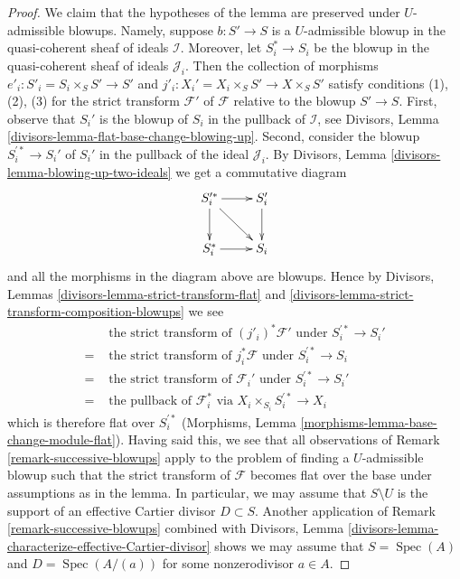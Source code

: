 \documentclass[10pt,a4paper]{amsart}
\theoremstyle{plain}
\theoremstyle{definition}
\theoremstyle{remark}
\numberwithin{equation}{subsection}
\def\Spec{\mathop{\mathrm{Spec}}}
\begin{document}
\begin{proof}
We claim that the hypotheses of the lemma are preserved under $U$-admissible
blowups. Namely, suppose $b : S' \to S$ is a $U$-admissible blowup in
the quasi-coherent sheaf of ideals $\mathcal{I}$. Moreover, let $S^*_i \to S_i$
be the blowup in the quasi-coherent sheaf of ideals $\mathcal{J}_i$.
Then the collection of morphisms $e'_i : S'_i = S_i \times_S S' \to S'$
and $j'_i : X_i' = X_i \times_S S' \to X \times_S S'$ satisfy conditions
(1), (2), (3) for the strict transform $\mathcal{F}'$ of $\mathcal{F}$
relative to the blowup $S' \to S$. First, observe that $S_i'$ is the
blowup of $S_i$ in the pullback of $\mathcal{I}$, see
Divisors, Lemma \ref{divisors-lemma-flat-base-change-blowing-up}.
Second, consider the blowup
$S_i^{\prime *} \to S_i'$ of $S_i'$ in the pullback of the ideal
$\mathcal{J}_i$.
By Divisors, Lemma \ref{divisors-lemma-blowing-up-two-ideals}
we get a commutative diagram
$$
\xymatrix{
S_i^{\prime *} \ar[r] \ar[rd] \ar[d] & S'_i \ar[d] \\
S_i^* \ar[r] & S_i
}
$$
and all the morphisms in the diagram above are blowups. Hence by
Divisors, Lemmas \ref{divisors-lemma-strict-transform-flat} and
\ref{divisors-lemma-strict-transform-composition-blowups}
we see
\begin{align*}
& \text{ the strict transform of }(j'_i)^*\mathcal{F}'\text{ under }
S_i^{\prime *} \to S_i' \\
= &
\text{ the strict transform of }j_i^*\mathcal{F}\text{ under }
S_i^{\prime *} \to S_i \\
= &
\text{ the strict transform of }\mathcal{F}_i'\text{ under }
S_i^{\prime *} \to S_i' \\
= &
\text{ the pullback of }\mathcal{F}_i^*\text{ via }
X_i \times_{S_i} S_i^{\prime *} \to X_i
\end{align*}
which is therefore flat over $S_i^{\prime *}$
(Morphisms, Lemma \ref{morphisms-lemma-base-change-module-flat}).
Having said this, we see that all observations of
Remark \ref{remark-successive-blowups} apply to the
problem of finding a $U$-admissible blowup such that the
strict transform of $\mathcal{F}$ becomes flat over the base
under assumptions as in the lemma. In particular, we may assume
that $S \setminus U$ is the support of an effective Cartier divisor
$D \subset S$. Another application of Remark \ref{remark-successive-blowups}
combined with
Divisors, Lemma \ref{divisors-lemma-characterize-effective-Cartier-divisor}
shows we may assume that $S = \Spec(A)$ and $D = \Spec(A/(a))$
for some nonzerodivisor $a \in A$.


\end{proof}
\end{document}
